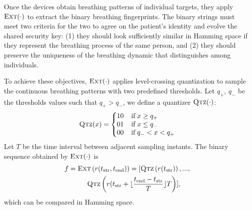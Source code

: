 Once the devices obtain breathing patterns of individual targets, they apply $\textsc{Ext} (\cdot)$ to extract the binary breathing fingerprints. The binary strings must meet two criteria for the two to agree on the patient's identity and evolve the shared security key: (1) they should look sufficiently similar in Hamming space if they represent the breathing process of the same person, and (2) they should preserve the uniqueness of the breathing dynamic that distinguishes among individuals.

To achieve these objectives, $\textsc{Ext} (\cdot)$ applies level-crossing quantization to sample the continuous breathing patterns with two predefined thresholds. Let $q_{+}$, $q_{-}$ be the thresholds values such that $q_{+} > q_{-}$, we define a quantizer $\textsc{Qtz} (\cdot)$:
\begin{equation*}
  \setlength{\arraycolsep}{0pt}
    \textsc{Qtz} (x) = \left\{ \begin{array}{ l l }
    10 &\;\;\;\;\text{if}\; x \geq q_{+} \\
    01 &\;\;\;\;\text{if}\; x \leq q_{-} \\
    00 &\;\;\;\;\text{if}\; q_{-} < x < q_{+}
  \end{array} \right.
\end{equation*}
Let $T$ be the time interval between adjacent sampling instants. The binary sequence obtained by $\textsc{Ext} (\cdot)$ is
\begin{multline*}
f = \textsc{Ext} \left(r(t_{\text{str}}, t_{\text{end}})\right) = [\textsc{Qtz} \left( r(t_{\text{str}}) \right),...,\\
    \;\;\;\;\;\;\;\textsc{Qtz} \left(r(t_{\text{str}} + \lfloor\frac{t_{\text{end}} - t_{\text{str}}}{T}\rfloor T \right)],
\end{multline*}
which can be compared in Hamming space.


